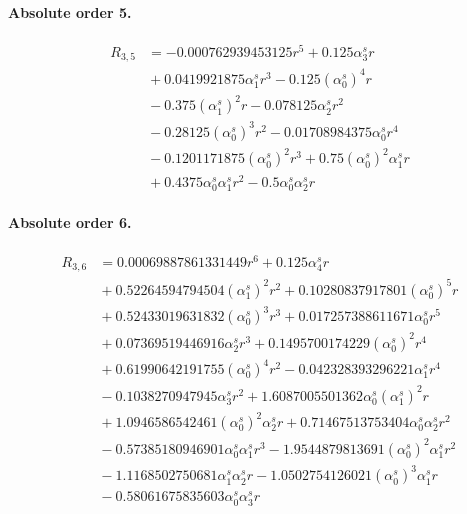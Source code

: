 \documentclass[10pt]{article}
\begin{document}
\paragraph{Absolute order 5.}
\begin{align*}
R_{3,5} &=  - 0.000762939453125 r^{5} + 0.125 \alpha_{3}^s r \\
&{}  + 0.0419921875 \alpha_{1}^s r^{3} - 0.125 \left(\alpha_{0}^s\right)^{4} r \\
&{}  - 0.375 \left(\alpha_{1}^s\right)^{2} r - 0.078125 \alpha_{2}^s r^{2} \\
&{}  - 0.28125 \left(\alpha_{0}^s\right)^{3} r^{2} - 0.01708984375 \alpha_{0}^s r^{4} \\
&{}  - 0.1201171875 \left(\alpha_{0}^s\right)^{2} r^{3} + 0.75 \left(\alpha_{0}^s\right)^{2} \alpha_{1}^s r \\
&{}  + 0.4375 \alpha_{0}^s \alpha_{1}^s r^{2} - 0.5 \alpha_{0}^s \alpha_{2}^s r
\end{align*}

\paragraph{Absolute order 6.}
\begin{align*}
R_{3,6} &= 0.00069887861331449 r^{6} + 0.125 \alpha_{4}^s r \\
&{}  + 0.52264594794504 \left(\alpha_{1}^s\right)^{2} r^{2} + 0.10280837917801 \left(\alpha_{0}^s\right)^{5} r \\
&{}  + 0.52433019631832 \left(\alpha_{0}^s\right)^{3} r^{3} + 0.017257388611671 \alpha_{0}^s r^{5} \\
&{}  + 0.07369519446916 \alpha_{2}^s r^{3} + 0.1495700174229 \left(\alpha_{0}^s\right)^{2} r^{4} \\
&{}  + 0.61990642191755 \left(\alpha_{0}^s\right)^{4} r^{2} - 0.042328393296221 \alpha_{1}^s r^{4} \\
&{}  - 0.1038270947945 \alpha_{3}^s r^{2} + 1.6087005501362 \alpha_{0}^s \left(\alpha_{1}^s\right)^{2} r \\
&{}  + 1.0946586542461 \left(\alpha_{0}^s\right)^{2} \alpha_{2}^s r + 0.71467513753404 \alpha_{0}^s \alpha_{2}^s r^{2} \\
&{}  - 0.57385180946901 \alpha_{0}^s \alpha_{1}^s r^{3} - 1.9544879813691 \left(\alpha_{0}^s\right)^{2} \alpha_{1}^s r^{2} \\
&{}  - 1.1168502750681 \alpha_{1}^s \alpha_{2}^s r - 1.0502754126021 \left(\alpha_{0}^s\right)^{3} \alpha_{1}^s r \\
&{}  - 0.58061675835603 \alpha_{0}^s \alpha_{3}^s r
\end{align*}
\end{document}
